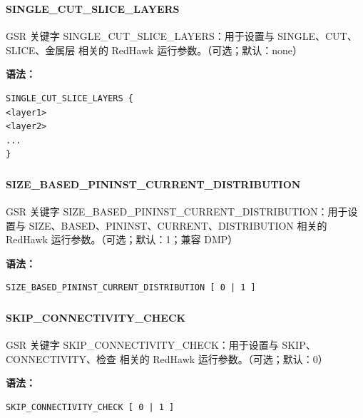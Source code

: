 \subsubsection{}
\paragraph*{SINGLE_CUT_SLICE_LAYERS}

GSR 关键字 SINGLE_CUT_SLICE_LAYERS：用于设置与 SINGLE、CUT、SLICE、金属层 相关的 RedHawk 运行参数。（可选；默认：none）

\textbf{语法：}
\begin{lstlisting}
SINGLE_CUT_SLICE_LAYERS {
<layer1>
<layer2>
...
}
\end{lstlisting}

\subsubsection{}
\paragraph*{SIZE_BASED_PININST_CURRENT_DISTRIBUTION}

GSR 关键字 SIZE_BASED_PININST_CURRENT_DISTRIBUTION：用于设置与 SIZE、BASED、PININST、CURRENT、DISTRIBUTION 相关的 RedHawk 运行参数。（可选；默认：1；兼容 DMP）

\textbf{语法：}
\begin{lstlisting}
SIZE_BASED_PININST_CURRENT_DISTRIBUTION [ 0 | 1 ]
\end{lstlisting}

\subsubsection{}
\paragraph*{SKIP_CONNECTIVITY_CHECK}

GSR 关键字 SKIP_CONNECTIVITY_CHECK：用于设置与 SKIP、CONNECTIVITY、检查 相关的 RedHawk 运行参数。（可选；默认：0）

\textbf{语法：}
\begin{lstlisting}
SKIP_CONNECTIVITY_CHECK [ 0 | 1 ]
\end{lstlisting}

\subsubsection{}
